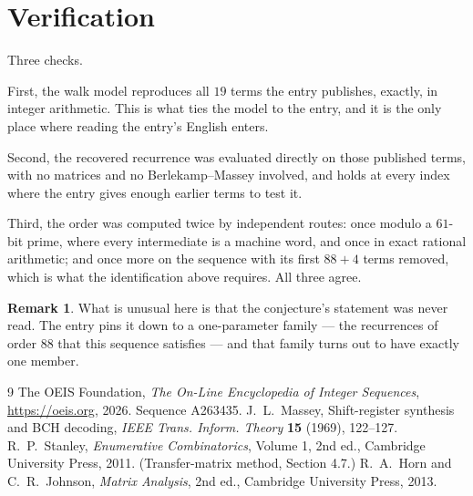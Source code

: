 \documentclass[11pt,a4paper]{article}
\theoremstyle{plain}
\theoremstyle{definition}
\newtheorem{remark}[theorem]{Remark}
\begin{document}
\section{Verification}

Three checks.

First, the walk model reproduces all $19$ terms the entry publishes, exactly, in integer
arithmetic. This is what ties the model to the entry, and it is the only place where reading
the entry's English enters.

Second, the recovered recurrence was evaluated directly on those published terms, with no
matrices and no Berlekamp--Massey involved, and holds at every index where the entry gives
enough earlier terms to test it.

Third, the order was computed twice by independent routes: once modulo a $61$-bit prime, where
every intermediate is a machine word, and once in exact rational arithmetic; and once more on
the sequence with its first $88+4$ terms removed, which is what the identification above
requires. All three agree.

\begin{remark}
What is unusual here is that the conjecture's statement was never read. The entry pins it down
to a one-parameter family --- the recurrences of order $88$ that this sequence satisfies
--- and that family turns out to have exactly one member.
\end{remark}

\begin{thebibliography}{9}
 The OEIS Foundation, \emph{The On-Line Encyclopedia of Integer
Sequences}, \url{https://oeis.org}, 2026. Sequence A263435.
 J.~L.~Massey, Shift-register synthesis and BCH decoding, \emph{IEEE
Trans. Inform. Theory} \textbf{15} (1969), 122--127.
 R.~P.~Stanley, \emph{Enumerative Combinatorics}, Volume 1, 2nd ed.,
Cambridge University Press, 2011. (Transfer-matrix method, Section 4.7.)
 R.~A.~Horn and C.~R.~Johnson, \emph{Matrix Analysis}, 2nd ed., Cambridge
University Press, 2013.
\end{thebibliography}
\end{document}
